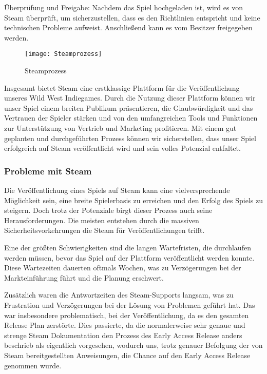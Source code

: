 Überprüfung und Freigabe:
Nachdem das Spiel hochgeladen ist, wird es von Steam überprüft, um sicherzustellen, dass es den Richtlinien entspricht und keine technischen Probleme aufweist.
Anschließend kann es vom Besitzer freigegeben werden.
\begin{figure}[H]
    \centering
    \texttt{[image: Steamprozess]}
    \caption{Steamprozess}
\end{figure}

Insgesamt bietet Steam eine erstklassige Plattform für die Veröffentlichung unseres Wild West Indiegames.
Durch die Nutzung dieser Plattform können wir unser Spiel einem breiten Publikum präsentieren, die Glaubwürdigkeit und das Vertrauen der Spieler stärken und von den umfangreichen Tools und Funktionen zur Unterstützung von Vertrieb und Marketing profitieren.
Mit einem gut geplanten und durchgeführten Prozess können wir sicherstellen, dass unser Spiel erfolgreich auf Steam veröffentlicht wird und sein volles Potenzial entfaltet.

 \subsubsection{Probleme mit Steam}\label{subsubsec:Steam-Herausforderungen}
Die Veröffentlichung eines Spiels auf Steam kann eine vielversprechende Möglichkeit sein, eine breite Spielerbasis zu erreichen und den Erfolg des Spiels zu steigern.
Doch trotz der Potenziale birgt dieser Prozess auch seine Herausforderungen.
Die meisten entstehen durch die massiven Sicherheitsvorkehrungen die Steam für Veröffentlichungen trifft.

Eine der größten Schwierigkeiten sind die langen Wartefristen, die durchlaufen werden müssen, bevor das Spiel auf der Plattform veröffentlicht werden konnte.
Diese Wartezeiten dauerten oftmals Wochen, was zu Verzögerungen bei der Markteinführung führt und die Planung erschwert.

Zusätzlich waren die Antwortzeiten des Steam-Supports langsam, was zu Frustration und Verzögerungen bei der Lösung von Problemen geführt hat.
Das war insbesondere problematisch, bei der Veröffentlichung, da es den gesamten Release Plan zerstörte.
Dies passierte, da die normalerweise sehr genaue und strenge Steam Dokumentation den Prozess des Early Access Release anders beschrieb als eigentlich vorgesehen, wodurch uns, trotz genauer Befolgung der von Steam bereitgestellten Anweisungen, die Chance auf den Early Access Release genommen wurde.

